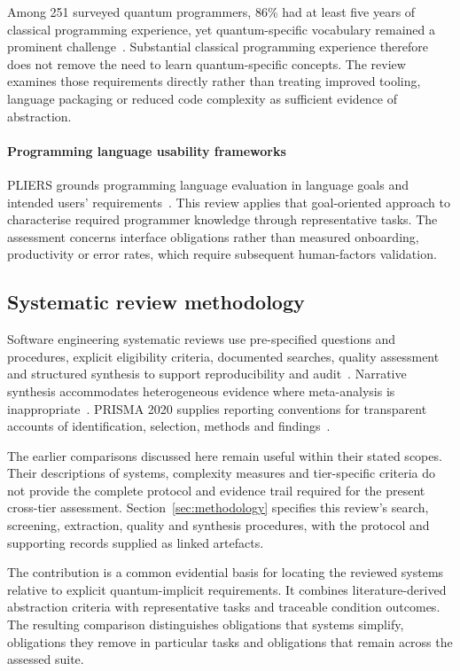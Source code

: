 Among 251 surveyed quantum programmers, 86\% had at least five years of classical programming experience, yet quantum-specific vocabulary remained a prominent challenge~\cite{ferreira2024qplusage}.
Substantial classical programming experience therefore does not remove the need to learn quantum-specific concepts.
The review examines those requirements directly rather than treating improved tooling, language packaging or reduced code complexity as sufficient evidence of abstraction.

\paragraph{Programming language usability frameworks}\label{subsec:background:usability}
PLIERS grounds programming language evaluation in language goals and intended users' requirements~\cite{Coblenz2021PLIERS}.
This review applies that goal-oriented approach to characterise required programmer knowledge through representative tasks.
The assessment concerns interface obligations rather than measured onboarding, productivity or error rates, which require subsequent human-factors validation.

\ifthesis
\subsection{Systematic review methodology}\label{subsec:background:slr}
Software engineering systematic reviews use pre-specified questions and procedures, explicit eligibility criteria, documented searches, quality assessment and structured synthesis to support reproducibility and audit~\cite{KitchenhamCharters2007SLR}.
Narrative synthesis accommodates heterogeneous evidence where meta-analysis is inappropriate~\cite{KitchenhamCharters2007SLR}.
PRISMA 2020 supplies reporting conventions for transparent accounts of identification, selection, methods and findings~\cite{page2021prisma}.

The earlier comparisons discussed here remain useful within their stated scopes.
Their descriptions of systems, complexity measures and tier-specific criteria do not provide the complete protocol and evidence trail required for the present cross-tier assessment.
Section~\ref{sec:methodology} specifies this review's search, screening, extraction, quality and synthesis procedures, with the protocol and supporting records supplied as linked artefacts.

The contribution is a common evidential basis for locating the reviewed systems relative to explicit quantum-implicit requirements.
It combines literature-derived abstraction criteria with representative tasks and traceable condition outcomes.
The resulting comparison distinguishes obligations that systems simplify, obligations they remove in particular tasks and obligations that remain across the assessed suite.
\fi